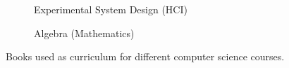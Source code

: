 \begin{figure}
  \centering
  \begin{subfigure}{0.48\textwidth}
    \centering
    \todo
    \caption{Experimental System Design (HCI)}
    \label{fig:meta_books_hci}
  \end{subfigure}
  \hspace{0.1em}
  \begin{subfigure}{0.48\textwidth}
    \centering
    \todo
    \caption{Algebra (Mathematics)}
    \label{fig:meta_books_math}
  \end{subfigure}
  \caption{Books used as curriculum for different computer science courses.}
  \label{fig:meta_books}
\end{figure}

